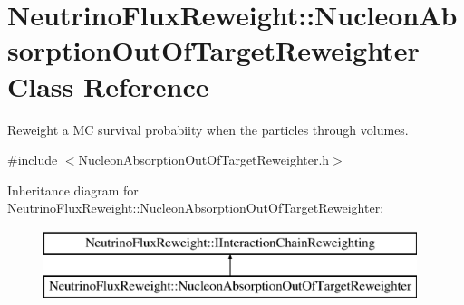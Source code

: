 \hypertarget{class_neutrino_flux_reweight_1_1_nucleon_absorption_out_of_target_reweighter}{\section{Neutrino\-Flux\-Reweight\-:\-:Nucleon\-Absorption\-Out\-Of\-Target\-Reweighter Class Reference}
\label{class_neutrino_flux_reweight_1_1_nucleon_absorption_out_of_target_reweighter}
}


Reweight a M\-C survival probabiity when the particles through volumes.  




{\ttfamily \#include $<$Nucleon\-Absorption\-Out\-Of\-Target\-Reweighter.\-h$>$}

Inheritance diagram for Neutrino\-Flux\-Reweight\-:\-:Nucleon\-Absorption\-Out\-Of\-Target\-Reweighter\-:\begin{figure}[H]
\begin{center}
\leavevmode
\includegraphics[height=2.000000cm]{class_neutrino_flux_reweight_1_1_nucleon_absorption_out_of_target_reweighter}
\end{center}
\end{figure}

